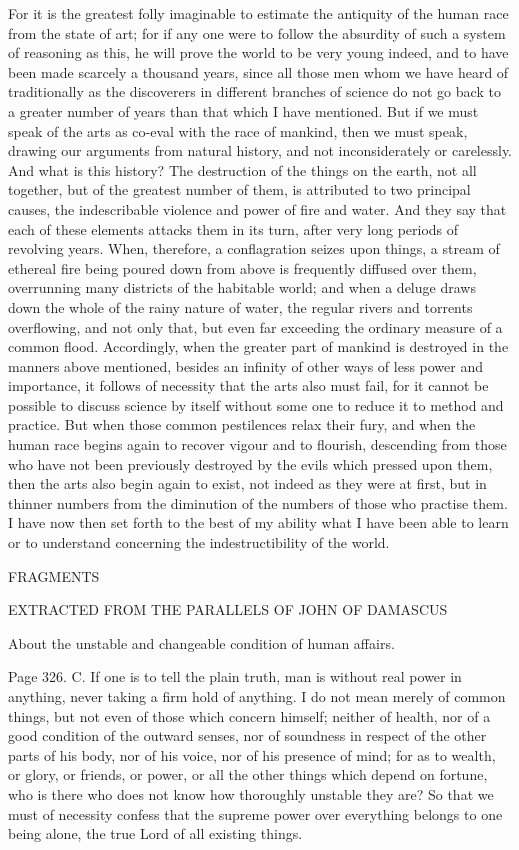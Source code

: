 For it is the greatest folly imaginable to estimate the antiquity of the human race from the state of
art; for if any one were to follow the absurdity of such a system of reasoning as this, he will prove
the world to be very young indeed, and to have been made scarcely a thousand years, since all
those men whom we have heard of traditionally as the discoverers in different branches of science
do not go back to a greater number of years than that which I have mentioned. But if we must
speak of the arts as co-eval with the race of mankind, then we must speak, drawing our arguments
from natural history, and not inconsiderately or carelessly. And what is this history? The
destruction of the things on the earth, not all together, but of the greatest number of them, is
attributed to two principal causes, the indescribable violence and power of fire and water. And they
say that each of these elements attacks them in its turn, after very long periods of revolving years.
When, therefore, a conflagration seizes upon things, a stream of ethereal fire being poured down
from above is frequently diffused over them, overrunning many districts of the habitable world; and
when a deluge draws down the whole of the rainy nature of water, the regular rivers and torrents
overflowing, and not only that, but even far exceeding the ordinary measure of a common flood.
Accordingly, when the greater part of mankind is destroyed in the manners above mentioned,
besides an infinity of other ways of less power and importance, it follows of necessity that the arts
also must fail, for it cannot be possible to discuss science by itself without some one to reduce it to
method and practice. But when those common pestilences relax their fury, and when the human
race begins again to recover vigour and to flourish, descending from those who have not been
previously destroyed by the evils which pressed upon them, then the arts also begin again to exist,
not indeed as they were at first, but in thinner numbers from the diminution of the numbers of those
who practise them. I have now then set forth to the best of my ability what I have been able to learn
or to understand concerning the indestructibility of the world.


FRAGMENTS

EXTRACTED FROM THE PARALLELS OF JOHN OF DAMASCUS

About the unstable and changeable condition of human affairs.

Page 326. C. If one is to tell the plain truth, man is without real power in anything, never taking a
firm hold of anything. I do not mean merely of common things, but not even of those which concern
himself; neither of health, nor of a good condition of the outward senses, nor of soundness in
respect of the other parts of his body, nor of his voice, nor of his presence of mind; for as to
wealth, or glory, or friends, or power, or all the other things which depend on fortune, who is there
who does not know how thoroughly unstable they are? So that we must of necessity confess that
the supreme power over everything belongs to one being alone, the true Lord of all existing things.

